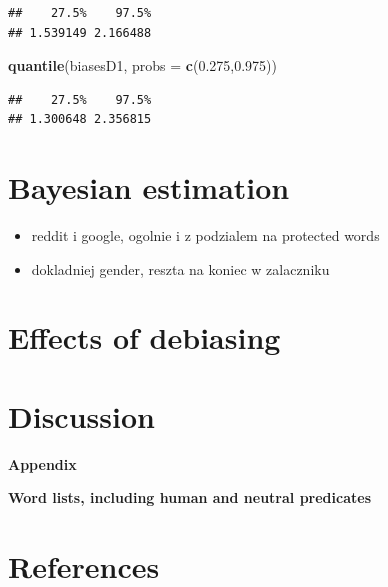 \documentclass[10pt,dvipsnames,enabledeprecatedfontcommands]{scrartcl}
\newenvironment{Shaded}{\begin{snugshade}}{\end{snugshade}}
\newcommand{\KeywordTok}[1]{\textcolor[rgb]{0.13,0.29,0.53}{\textbf{#1}}}
\newcommand{\DataTypeTok}[1]{\textcolor[rgb]{0.13,0.29,0.53}{#1}}
\newcommand{\FloatTok}[1]{\textcolor[rgb]{0.00,0.00,0.81}{#1}}
\newcommand{\NormalTok}[1]{#1}
\begin{document}
\begin{verbatim}
##    27.5%    97.5% 
## 1.539149 2.166488
\end{verbatim}

\begin{Shaded}
\begin{Highlighting}[]
\KeywordTok{quantile}\NormalTok{(biasesD1, }\DataTypeTok{probs =} \KeywordTok{c}\NormalTok{(}\FloatTok{0.275}\NormalTok{,}\FloatTok{0.975}\NormalTok{))}
\end{Highlighting}
\end{Shaded}

\begin{verbatim}
##    27.5%    97.5% 
## 1.300648 2.356815
\end{verbatim}

\normalsize

\section{Bayesian estimation}\label{bayesian-estimation}

\begin{itemize}
\item
  reddit i google, ogolnie i z podzialem na protected words
\item
  dokladniej gender, reszta na koniec w zalaczniku
\end{itemize}

\section{Effects of debiasing}\label{effects-of-debiasing}

\section{Discussion}\label{discussion}

\newpage

\noindent \huge  \textbf{Appendix} \normalsize

\noindent \Large \textbf{Word lists, including human and neutral predicates}
\normalsize

\section*{References}\label{references}

\vspace{-3mm}
\end{document}
